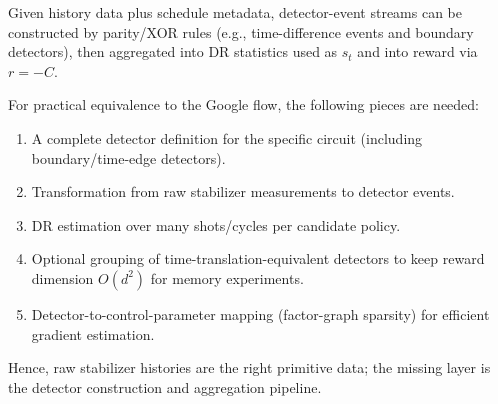 \documentclass[11pt]{article}
\begin{document}
Given history data plus schedule metadata, detector-event streams can be constructed by parity/XOR rules (e.g., time-difference events and boundary detectors), then aggregated into DR statistics used as $s_t$ and into reward via $r=-C$.

For practical equivalence to the Google flow, the following pieces are needed:
\begin{enumerate}
\item A complete detector definition for the specific circuit (including boundary/time-edge detectors).
\item Transformation from raw stabilizer measurements to detector events.
\item DR estimation over many shots/cycles per candidate policy.
\item Optional grouping of time-translation-equivalent detectors to keep reward dimension $O(d^2)$ for memory experiments.
\item Detector-to-control-parameter mapping (factor-graph sparsity) for efficient gradient estimation.
\end{enumerate}

Hence, raw stabilizer histories are the right primitive data; the missing layer is the detector construction and aggregation pipeline.
\end{document}

